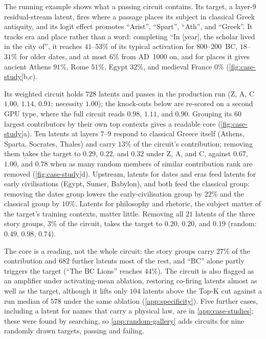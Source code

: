 \documentclass[10pt]{article}
\begin{document}
The running example shows what a passing circuit contains.
Its target, a layer-9 residual-stream latent, fires where a passage places its subject in classical Greek antiquity, and its logit effect promotes ``Arist'', ``Spart'', ``Ath'', and ``Greek''.
It tracks era and place rather than a word: completing ``In [year], the scholar lived in the city of'', it reaches $41$--$53\%$ of its typical activation for 800--200~BC, $18$--$31\%$ for older dates, and at most $6\%$ from AD~1000 on, and for places it gives ancient Athens $91\%$, Rome $51\%$, Egypt $32\%$, and medieval France $0\%$ (\cref{fig:case-study}b,c).

Its weighted circuit holds $728$ latents and passes in the production run (Z, A, C $1.00$, $1.14$, $0.91$; necessity $1.00$); the knock-outs below are re-scored on a second GPU type, where the full circuit reads $0.98$, $1.11$, and $0.90$.
Grouping its $60$ largest contributors by their own top contexts gives a readable core (\cref{fig:case-study}a).
Ten latents at layers 7--9 respond to classical Greece itself (Athens, Sparta, Socrates, Thales) and carry $13\%$ of the circuit's contribution; removing them takes the target to $0.29$, $0.22$, and $0.32$ under Z, A, and C, against $0.67$, $1.00$, and $0.78$ when as many random members of similar contribution rank are removed (\cref{fig:case-study}d).
Upstream, latents for dates and eras feed latents for early civilisations (Egypt, Sumer, Babylon), and both feed the classical group: removing the dates group lowers the early-civilisation group by $22\%$ and the classical group by $10\%$.
Latents for philosophy and rhetoric, the subject matter of the target's training contexts, matter little.
Removing all $21$ latents of the three story groups, $3\%$ of the circuit, takes the target to $0.20$, $0.20$, and $0.19$ (random: $0.49$, $0.98$, $0.74$).

The core is a reading, not the whole circuit: the story groups carry $27\%$ of the contribution and $682$ further latents most of the rest, and ``BC'' alone partly triggers the target (``The BC Lions'' reaches $44\%$).
The circuit is also flagged as an amplifier under activating-mean ablation, restoring co-firing latents almost as well as the target, although it lifts only $104$ latents above the Top-K cut against a run median of $578$ under the same ablation (\cref{app:specificity}).
Five further cases, including a latent for names that carry a physical law, are in \cref{app:case-studies}; these were found by searching, so \cref{app:random-gallery} adds circuits for nine randomly drawn targets, passing and failing.
\end{document}
